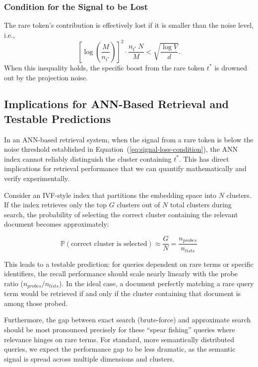 \documentclass[manuscript]{acmart}
\begin{document}
\subsubsection{Condition for the Signal to be Lost}
The rare token's contribution is effectively lost if it is smaller than the noise level, i.e.,
\begin{equation}\label{eq:signal-loss-condition}
\left[\log\!\left(\frac{M}{n_{t^*}}\right)\right]^2 \cdot \frac{n_{t^*}\, N}{M} < \sqrt{\frac{\log V}{d}}.
\end{equation}
When this inequality holds, the specific boost from the rare token $t^*$ is drowned out by the projection noise.

\subsection{Implications for ANN-Based Retrieval and Testable Predictions}

In an ANN-based retrieval system, when the signal from a rare token is below the noise threshold established in Equation~(\ref{eq:signal-loss-condition}), the ANN index cannot reliably distinguish the cluster containing $t^*$. This has direct implications for retrieval performance that we can quantify mathematically and verify experimentally.

Consider an IVF-style index that partitions the embedding space into $N$ clusters. If the index retrieves only the top $G$ clusters out of $N$ total clusters during search, the probability of selecting the correct cluster containing the relevant document becomes approximately:

\begin{equation}
\mathbb{P}(\text{correct cluster is selected}) \approx \frac{G}{N} = \frac{n_{probes}}{n_{lists}}
\end{equation}

This leads to a testable prediction: for queries dependent on rare terms or specific identifiers, the recall performance should scale nearly linearly with the probe ratio ($n_{probes}/n_{lists}$). In the ideal case, a document perfectly matching a rare query term would be retrieved if and only if the cluster containing that document is among those probed.

Furthermore, the gap between exact search (brute-force) and approximate search should be most pronounced precisely for these ``spear fishing'' queries where relevance hinges on rare terms. For standard, more semantically distributed queries, we expect the performance gap to be less dramatic, as the semantic signal is spread across multiple dimensions and clusters.
\end{document}
